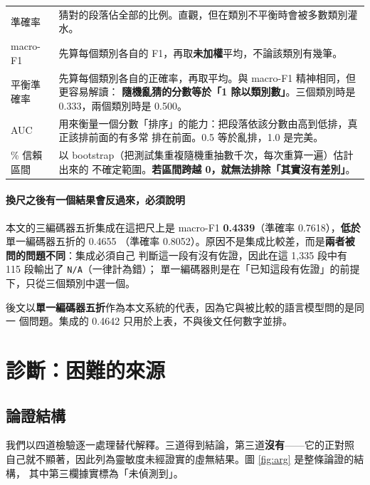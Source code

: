 \documentclass[11pt,a4paper]{ctexart}
\newcommand{\fn}[1]{\texttt{#1}}
\begin{document}
\begin{table}[h]
\centering\small
\begin{tabular}{@{}p{2.6cm}p{12cm}@{}}
\toprule
準確率 & 猜對的段落佔全部的比例。直觀，但在類別不平衡時會被多數類別灌水。 \\
\addlinespace
macro-F1 & 先算每個類別各自的 F1，再取\textbf{未加權}平均，不論該類別有幾筆。 \\
\addlinespace
平衡準確率 & 先算每個類別各自的正確率，再取平均。與 macro-F1 精神相同，但更容易解讀：
\textbf{隨機亂猜的分數等於「1 除以類別數」}。三個類別時是 0.333，兩個類別時是 0.500。 \\
\addlinespace
AUC & 用來衡量一個分數「排序」的能力：把段落依該分數由高到低排，真正該排前面的有多常
排在前面。0.5 等於亂排，1.0 是完美。 \\
\addlinespace
95\% 信賴區間 & 以 bootstrap（把測試集重複隨機重抽數千次，每次重算一遍）估計出來的
不確定範圍。\textbf{若區間跨越 0，就無法排除「其實沒有差別」}。 \\
\bottomrule
\end{tabular}
\end{table}

\paragraph{換尺之後有一個結果會反過來，必須說明} 本文的三編碼器五折集成在這把尺上是
macro-F1 \textbf{0.4339}（準確率 0.7618），\textbf{低於}單一編碼器五折的 0.4655
（準確率 0.8052）。原因不是集成比較差，而是\textbf{兩者被問的問題不同}：集成必須自己
判斷這一段有沒有佐證，因此在這 1,335 段中有 115 段輸出了 \fn{N/A}（一律計為錯）；
單一編碼器則是在「已知這段有佐證」的前提下，只從三個類別中選一個。

\medskip
後文以\textbf{單一編碼器五折}作為本文系統的代表，因為它與被比較的語言模型問的是同一
個問題。集成的 0.4642 只用於上表，不與後文任何數字並排。

\section{診斷：困難的來源}
\label{sec:diag}

\subsection{論證結構}

我們以四道檢驗逐一處理替代解釋。三道得到結論，第三道\textbf{沒有}——它的正對照
自己就不顯著，因此列為靈敏度未經證實的虛無結果。圖 \ref{fig:arg} 是整條論證的結構，
其中第三欄據實標為「未偵測到」。
\end{document}
